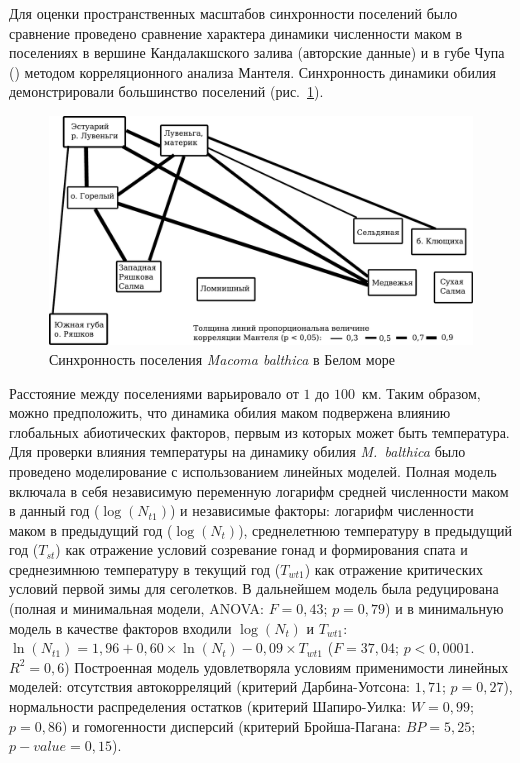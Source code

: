 {{Для оценки пространственных масштабов синхронности поселений было сравнение проведено сравнение характера динамики численности маком в поселениях в вершине Кандалакшского залива (авторские данные) и в губе Чупа (\cite{Maximovich_et_al_1991, Gerasimova_Maximovich_2013, Varfolomeeva_Naumov_2013}) методом корреляционного анализа Мантеля.
Синхронность динамики обилия демонстрировали большинство поселений (рис.~\ref{ris:mantel}).
	\begin{figure}[]
	\begin{center}	
		\includegraphics[width=\textwidth]{../White_Sea/dynamic_N_N1/mantel1.pdf}
	\end{center}
		\caption{Синхронность поселения \textit{Macoma balthica} в Белом море}
		\label{ris:mantel}
	\end{figure}
Расстояние между поселениями варьировало от $1$ до $100$~км.
Таким образом, можно предположить, что динамика обилия маком подвержена влиянию глобальных абиотических факторов, первым из которых может быть температура. 
Для проверки влияния температуры на динамику обилия \textit{M.~balthica} было проведено моделирование с использованием линейных моделей. 
Полная модель включала в себя независимую переменную логарифм средней численности маком в данный год ($\log(N_{t1})$) и независимые факторы: логарифм численности маком в предыдущий год ($\log(N_{t})$), среднелетнюю температуру в предыдущий год ($T_{st}$) как отражение условий созревание гонад и формирования спата и среднезимнюю температуру в текущий год ($T_{wt1}$) как отражение критических условий первой зимы для сеголетков. 
В дальнейшем модель была редуцирована (полная и минимальная модели, ANOVA: $F = 0,43$; $p = 0,79$) и в минимальную модель в качестве факторов входили $\log(N_{t})$ и $T_{wt1}$: $\ln(N_{t1}) = 1,96 + 0,60 \times \ln(N_{t}) - 0,09 \times T_{wt1}$ ($F = 37,04$; $p < 0,0001$. $R^2 = 0,6$)
Построенная модель удовлетворяла условиям применимости линейных моделей: отсутствия автокорреляций (критерий Дарбина-Уотсона: $1,71$; $p = 0,27$), нормальности распределения остатков (критерий Шапиро-Уилка: $W = 0,99$; $p = 0,86$) и гомогенности дисперсий (критерий Бройша-Пагана: $BP = 5,25$; $p-value = 0,15$). 

}}
